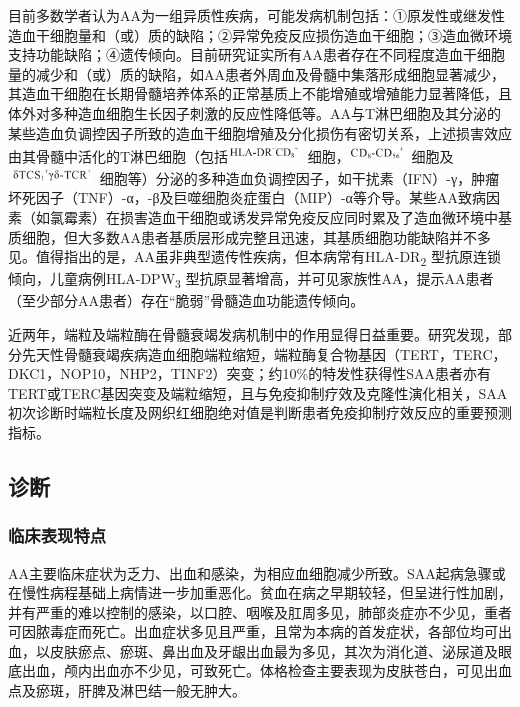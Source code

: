 目前多数学者认为AA为一组异质性疾病，可能发病机制包括：①原发性或继发性造血干细胞量和（或）质的缺陷；②异常免疫反应损伤造血干细胞；③造血微环境支持功能缺陷；④遗传倾向。目前研究证实所有AA患者存在不同程度造血干细胞量的减少和（或）质的缺陷，如AA患者外周血及骨髓中集落形成细胞显著减少，其造血干细胞在长期骨髓培养体系的正常基质上不能增殖或增殖能力显著降低，且体外对多种造血细胞生长因子刺激的反应性降低等。AA与T淋巴细胞及其分泌的某些造血负调控因子所致的造血干细胞增殖及分化损伤有密切关系，上述损害效应由其骨髓中活化的T淋巴细胞（包括\includegraphics[width=0.78125in,height=0.17708in]{./images/Image00124.jpg}
细胞，\includegraphics[width=0.59375in,height=0.19792in]{./images/Image00125.jpg}
细胞及\includegraphics[width=0.90625in,height=0.17708in]{./images/Image00126.jpg}
细胞等）分泌的多种造血负调控因子，如干扰素（IFN）-γ，肿瘤坏死因子（TNF）-α，-β及巨噬细胞炎症蛋白（MIP）-α等介导。某些AA致病因素（如氯霉素）在损害造血干细胞或诱发异常免疫反应同时累及了造血微环境中基质细胞，但大多数AA患者基质层形成完整且迅速，其基质细胞功能缺陷并不多见。值得指出的是，AA虽非典型遗传性疾病，但本病常有HLA-DR\textsubscript{2}
型抗原连锁倾向，儿童病例HLA-DPW\textsubscript{3}
型抗原显著增高，并可见家族性AA，提示AA患者（至少部分AA患者）存在“脆弱”骨髓造血功能遗传倾向。

近两年，端粒及端粒酶在骨髓衰竭发病机制中的作用显得日益重要。研究发现，部分先天性骨髓衰竭疾病造血细胞端粒缩短，端粒酶复合物基因（TERT，TERC，DKC1，NOP10，NHP2，TINF2）突变；约10\%的特发性获得性SAA患者亦有TERT或TERC基因突变及端粒缩短，且与免疫抑制疗效及克隆性演化相关，SAA初次诊断时端粒长度及网织红细胞绝对值是判断患者免疫抑制疗效反应的重要预测指标。

\subsection{诊断}

\subsubsection{临床表现特点}

AA主要临床症状为乏力、出血和感染，为相应血细胞减少所致。SAA起病急骤或在慢性病程基础上病情进一步加重恶化。贫血在病之早期较轻，但呈进行性加剧，并有严重的难以控制的感染，以口腔、咽喉及肛周多见，肺部炎症亦不少见，重者可因脓毒症而死亡。出血症状多见且严重，且常为本病的首发症状，各部位均可出血，以皮肤瘀点、瘀斑、鼻出血及牙龈出血最为多见，其次为消化道、泌尿道及眼底出血，颅内出血亦不少见，可致死亡。体格检查主要表现为皮肤苍白，可见出血点及瘀斑，肝脾及淋巴结一般无肿大。


